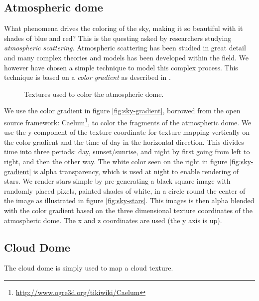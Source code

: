 \subsection{Atmospheric dome}
What phenomena drives the coloring of the sky, making it so beautiful
with it shades of blue and red?
This is the questing asked by researchers studying 
\emph{atmospheric scattering}. Atmospheric scattering has been studied
in great detail and many complex theories and models has been
developed within the field. We however have chosen a simple technique
to model this complex process. This technique is based on a
\emph{color gradient} as described in .

\begin{figure}[!h]
  \centering
  \hspace{8mm}
  \caption{Textures used to color the atmospheric dome.}
  \label{fig:atmosphere}
\end{figure}

We use the color gradient in figure \ref{fig:sky-gradient}, borrowed
from the open source framework:
Caelum\footnote{\url{http://www.ogre3d.org/tikiwiki/Caelum}}, to color
the fragments of the atmospheric dome. We use the y-component of the
texture coordinate for texture mapping vertically on the color
gradient and the time of day in the horizontal direction. This divides
time into three periods: day, sunset/sunrise, and night by first going
from left to right, and then the other way.
%
The white color seen on the right in figure \ref{fig:sky-gradient}
is alpha transparency, which is used at night to enable rendering of
stars. We render stars simple by pre-generating a black square image
with randomly placed pixels, painted shades of white, in a circle
round the center of the image as illustrated in figure
\ref{fig:sky-stars}. This images is then alpha blended with the color
gradient based on the three dimensional texture coordinates of the
atmospheric dome. The x and z coordinates are used (the y axis is up).

\subsection{Cloud Dome}
The cloud dome is simply used to map a cloud texture.

